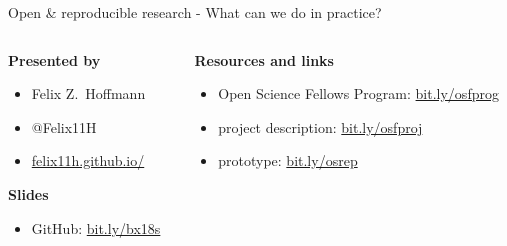 \begin{frame}
  \vspace{0.6cm}
  
  \begin{center} 
    \Large Open \& reproducible research - What can we do in practice?
  \end{center}
  
  \vspace{0.8cm}

  \small
  \begin{columns}[t]
    \begin{column}{0.4\textwidth}        
      \textbf{Presented by}
      
      \begin{itemize}[leftmargin=0.6cm]
        \itemsep0pt
      \item[] Felix Z.~Hoffmann
        \item[] @Felix11H
        \item[] \href{http://felix11h.github.io/}{felix11h.github.io/}
      \end{itemize}

      \vspace{0.28cm}
      \textbf{Slides}
      
      \begin{itemize}[leftmargin=0.6cm]
        \item[] GitHub: %
          \href{http://bit.ly/bx18s}{bit.ly/bx18s}
      \end{itemize}
    \end{column}
    \begin{column}{0.59\textwidth}
      \textbf{Resources and links}
      \vspace{-0.1cm}
       
      \begin{itemize}[leftmargin=0.6cm]
        \itemsep4pt
        \item[] Open Science Fellows Program: %
          \href{http://bit.ly/osfprog}{bit.ly/osfprog}
        \item[] project description: %
          \href{http://bit.ly/osfproj}{bit.ly/osfproj}
        \item[] prototype: \href{http://bit.ly/osrep}{bit.ly/osrep}
      \end{itemize}




\end{column}
\end{columns}
\end{frame}
